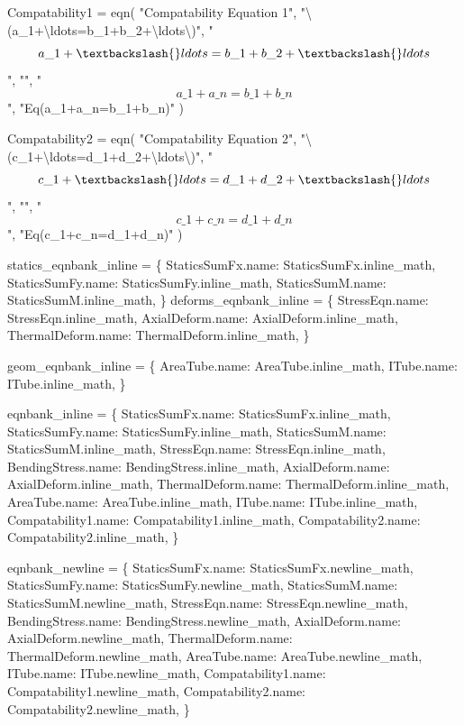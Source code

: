\documentclass[
  letterpaper,
  DIV=11,
  numbers=noendperiod]{scrreprt}
\newenvironment{Shaded}{\begin{snugshade}}{\end{snugshade}}
\newcommand{\NormalTok}[1]{\textcolor[rgb]{0.00,0.23,0.31}{#1}}
\begin{document}
\begin{Shaded}
\begin{Highlighting}[]
\NormalTok{Compatability1 = eqn(}
\NormalTok{    "Compatability Equation 1",}
\NormalTok{    "\textbackslash{}(a\_1+\textbackslash{}ldots=b\_1+b\_2+\textbackslash{}ldots\textbackslash{})", }
\NormalTok{    "$$a\_1+\textbackslash{}ldots=b\_1+b\_2+\textbackslash{}ldots$$", }
\NormalTok{    "",}
\NormalTok{    "$$a\_1+a\_n=b\_1+b\_n$$",}
\NormalTok{    "Eq(a\_1+a\_n=b\_1+b\_n)" }
\NormalTok{)}

\NormalTok{Compatability2 = eqn(}
\NormalTok{    "Compatability Equation 2",}
\NormalTok{    "\textbackslash{}(c\_1+\textbackslash{}ldots=d\_1+d\_2+\textbackslash{}ldots\textbackslash{})", }
\NormalTok{    "$$c\_1+\textbackslash{}ldots=d\_1+d\_2+\textbackslash{}ldots$$", }
\NormalTok{    "",}
\NormalTok{    "$$c\_1+c\_n=d\_1+d\_n$$",}
\NormalTok{    "Eq(c\_1+c\_n=d\_1+d\_n)" }
\NormalTok{)}


\NormalTok{statics\_eqnbank\_inline = \{}
\NormalTok{    StaticsSumFx.name: StaticsSumFx.inline\_math,}
\NormalTok{    StaticsSumFy.name: StaticsSumFy.inline\_math,}
\NormalTok{    StaticsSumM.name: StaticsSumM.inline\_math,}
\NormalTok{\}}
\NormalTok{deforms\_eqnbank\_inline = \{}
\NormalTok{    StressEqn.name: StressEqn.inline\_math,}
\NormalTok{    AxialDeform.name: AxialDeform.inline\_math,}
\NormalTok{    ThermalDeform.name: ThermalDeform.inline\_math,}
\NormalTok{\}}

\NormalTok{geom\_eqnbank\_inline = \{}
\NormalTok{    AreaTube.name: AreaTube.inline\_math,}
\NormalTok{    ITube.name: ITube.inline\_math,}
\NormalTok{\}}

\NormalTok{eqnbank\_inline = \{}
\NormalTok{    StaticsSumFx.name: StaticsSumFx.inline\_math,}
\NormalTok{    StaticsSumFy.name: StaticsSumFy.inline\_math,}
\NormalTok{    StaticsSumM.name: StaticsSumM.inline\_math,}
\NormalTok{    StressEqn.name: StressEqn.inline\_math,}
\NormalTok{    BendingStress.name: BendingStress.inline\_math,}
\NormalTok{    AxialDeform.name: AxialDeform.inline\_math,}
\NormalTok{    ThermalDeform.name: ThermalDeform.inline\_math,}
\NormalTok{    AreaTube.name: AreaTube.inline\_math,}
\NormalTok{    ITube.name: ITube.inline\_math,}
\NormalTok{    Compatability1.name: Compatability1.inline\_math,}
\NormalTok{    Compatability2.name: Compatability2.inline\_math,}
\NormalTok{\}}

\NormalTok{eqnbank\_newline = \{}
\NormalTok{    StaticsSumFx.name: StaticsSumFx.newline\_math,}
\NormalTok{    StaticsSumFy.name: StaticsSumFy.newline\_math,}
\NormalTok{    StaticsSumM.name: StaticsSumM.newline\_math,}
\NormalTok{    StressEqn.name: StressEqn.newline\_math,}
\NormalTok{    BendingStress.name: BendingStress.newline\_math,}
\NormalTok{    AxialDeform.name: AxialDeform.newline\_math,}
\NormalTok{    ThermalDeform.name: ThermalDeform.newline\_math,}
\NormalTok{    AreaTube.name: AreaTube.newline\_math,}
\NormalTok{    ITube.name: ITube.newline\_math,}
\NormalTok{    Compatability1.name: Compatability1.newline\_math,}
\NormalTok{    Compatability2.name: Compatability2.newline\_math,}
\NormalTok{\}}




\end{Highlighting}
\end{Shaded}
\end{document}
